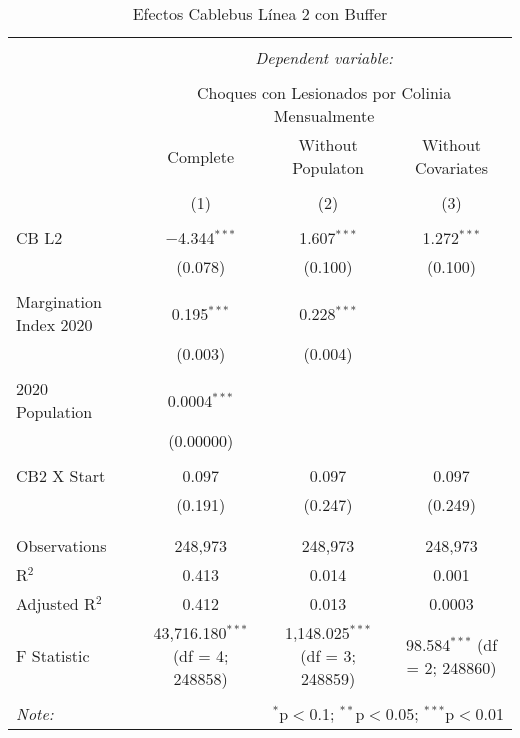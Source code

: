 
\begin{table}[!htbp] \centering 
  \caption{Efectos Cablebus Línea 2 con Buffer} 
  \label{} 
\begin{tabular}{@{\extracolsep{5pt}}lccc} 
\\[-1.8ex]\hline 
\hline \\[-1.8ex] 
 & \multicolumn{3}{c}{\textit{Dependent variable:}} \\ 
\cline{2-4} 
\\[-1.8ex] & \multicolumn{3}{c}{Choques con Lesionados por Colinia Mensualmente} \\ 
 & Complete & Without Populaton & Without Covariates \\ 
\\[-1.8ex] & (1) & (2) & (3)\\ 
\hline \\[-1.8ex] 
 CB L2 & $-$4.344$^{***}$ & 1.607$^{***}$ & 1.272$^{***}$ \\ 
  & (0.078) & (0.100) & (0.100) \\ 
  & & & \\ 
 Margination Index 2020 & 0.195$^{***}$ & 0.228$^{***}$ &  \\ 
  & (0.003) & (0.004) &  \\ 
  & & & \\ 
 2020 Population & 0.0004$^{***}$ &  &  \\ 
  & (0.00000) &  &  \\ 
  & & & \\ 
 CB2 X Start & 0.097 & 0.097 & 0.097 \\ 
  & (0.191) & (0.247) & (0.249) \\ 
  & & & \\ 
\hline \\[-1.8ex] 
Observations & 248,973 & 248,973 & 248,973 \\ 
R$^{2}$ & 0.413 & 0.014 & 0.001 \\ 
Adjusted R$^{2}$ & 0.412 & 0.013 & 0.0003 \\ 
F Statistic & 43,716.180$^{***}$ (df = 4; 248858) & 1,148.025$^{***}$ (df = 3; 248859) & 98.584$^{***}$ (df = 2; 248860) \\ 
\hline 
\hline \\[-1.8ex] 
\textit{Note:}  & \multicolumn{3}{r}{$^{*}$p$<$0.1; $^{**}$p$<$0.05; $^{***}$p$<$0.01} \\ 
\end{tabular} 
\end{table} 
